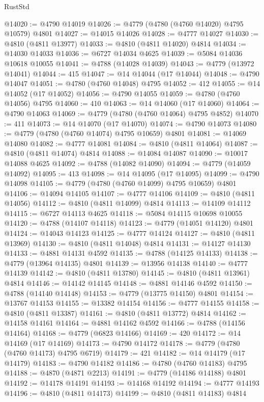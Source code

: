 \begin{lexlean}{RustStd}
\begin{coremodule}
@14020 := @4790 @14019
@14026 := @4779 (@4780 (@4760 @14020) @4795 @10579) @4801
@14027 := @14015 @14026
@14028 := @4777 @14027
@14030 := @4810 (@4811 @13977)
@14033 := @4810 (@4811 @14020) @4814
@14034 := @14030 @14033
@14036 := @6727 @14034 @4625
@14039 := @5084 @14036 @10618 @10055
@14041 := @4788 (@14028 @14039)
@14043 := @4779 (@13972 @14041)
@14044 := 415
@14047 := @14 @14044 (@17 @14044)
@14048 := @4790 @14047
@14051 := @4780 (@4760 @14048) @4795
@14052 := 412
@14055 := @14 @14052 (@17 @14052)
@14056 := @4790 @14055
@14059 := @4780 (@4760 @14056) @4795
@14060 := 410
@14063 := @14 @14060 (@17 @14060)
@14064 := @4790 @14063
@14069 := @4779 (@4780 (@4760 @14064) @4795 @4852)
@14070 := 411
@14073 := @14 @14070 (@17 @14070)
@14074 := @4790 @14073
@14080 := @4779 (@4780 (@4760 @14074) @4795 @10659) @4801
@14081 := @14069 @14080
@14082 := @4777 @14081
@14084 := @4810 (@4811 @14064)
@14087 := @4810 (@4811 @14074) @4814
@14088 := @14084 @14087
@14090 := @10017 @14088 @4625
@14092 := @4788 (@14082 @14090)
@14094 := @4779 (@14059 @14092)
@14095 := 413
@14098 := @14 @14095 (@17 @14095)
@14099 := @4790 @14098
@14105 := @4779 (@4780 (@4760 @14099) @4795 @10659) @4801
@14106 := @14094 @14105
@14107 := @4777 @14106
@14109 := @4810 (@4811 @14056)
@14112 := @4810 (@4811 @14099) @4814
@14113 := @14109 @14112
@14115 := @6727 @14113 @4625
@14118 := @5084 @14115 @10698 @10055
@14120 := @4788 (@14107 @14118)
@14123 := @4779 (@14051 @14120) @4801
@14124 := @14043 @14123
@14125 := @4777 @14124
@14127 := @4810 (@4811 @13969)
@14130 := @4810 (@4811 @14048) @4814
@14131 := @14127 @14130
@14133 := @4881 @14131 @4592
@14135 := @4788 (@14125 @14133)
@14138 := @4779 (@13964 @14135) @4801
@14139 := @13956 @14138
@14140 := @4777 @14139
@14142 := @4810 (@4811 @13780)
@14145 := @4810 (@4811 @13961) @4814
@14146 := @14142 @14145
@14148 := @4881 @14146 @4592
@14150 := @4788 (@14140 @14148)
@14153 := @4779 (@13775 @14150) @4801
@14154 := @13767 @14153
@14155 := @13382 @14154
@14156 := @4777 @14155
@14158 := @4810 (@4811 @13387)
@14161 := @4810 (@4811 @13772) @4814
@14162 := @14158 @14161
@14164 := @4881 @14162 @4592
@14166 := @4788 (@14156 @14164)
@14168 := @4779 (@6823 @14166)
@14169 := 420
@14172 := @14 @14169 (@17 @14169)
@14173 := @4790 @14172
@14178 := @4779 (@4780 (@4760 @14173) @4795 @6719)
@14179 := 421
@14182 := @14 @14179 (@17 @14179)
@14183 := @4790 @14182
@14186 := @4780 (@4760 @14183) @4795
@14188 := @4870 (@4871 @2213)
@14191 := @4779 (@14186 @14188) @4801
@14192 := @14178 @14191
@14193 := @14168 @14192
@14194 := @4777 @14193
@14196 := @4810 (@4811 @14173)
@14199 := @4810 (@4811 @14183) @4814

\end{coremodule}
\end{lexlean}
